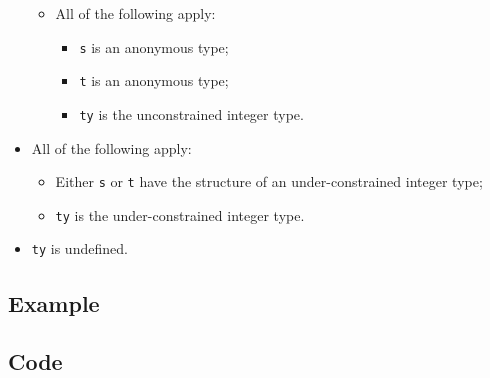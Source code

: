 \documentclass{book}
\begin{document}
\begin{itemize}
\begin{itemize}
      \item All of the following apply:
        \begin{itemize}
        \item \texttt{s} is an anonymous type;
        \item \texttt{t} is an anonymous type;
	\item \texttt{ty} is the unconstrained integer type. 
        \end{itemize}
    \end{itemize}

  \item All of the following apply:
    \begin{itemize}
    \item Either \texttt{s} or \texttt{t} have the structure of an under-constrained integer type;
    \item \texttt{ty} is the under-constrained integer type. 
    \end{itemize}

  \item \texttt{ty} is undefined.
  \end{itemize}

  \subsection{Example}

  \subsection{Code}
\end{document}
